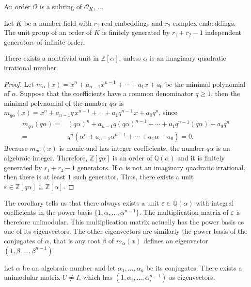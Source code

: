 \begin{definition}
  An order $\mathcal O$ is a subring of $\mathcal O_K$,
  ...
\end{definition}

\begin{theorem}
  Let $K$ be a number field with $r₁$ real embeddings and $r₂$ complex embeddings.
  The unit group of an order of $K$ is finitely generated by $r₁ + r₂ - 1$
  independent generators of infinite order.
\end{theorem}

\begin{corollary}
  \label{cor:nontrivial-unit}
  There exists a nontrivial unit in $ℤ[α]$,
  unless $α$ is an imaginary quadratic irrational number.
\end{corollary}

\begin{proof}
  Let $m_α(x) = x^n + a_{n-1} x^{n-1} + ⋯ + a_1 x + a_0$ be the minimal polynomial of $α$.
  Suppose that the coefficients have a common denominator $q ≥ 1$,
  then the minimal polynomial of the number $q α$ is
  $m_{q α}(x) = x^n + a_{n-1} q \, x^{n-1} + ⋯ + a_1 q^{n-1} \, x + a_0 q^n$,
  since
  \begin{align*}
    m_{qα}(qα) = {} & (q α)^n + a_{n-1} q (q α)^{n-1} + ⋯ + a_1 q^{n-1} (q α) + a_0 q^n \\
     = {}           & q^n (α^n + a_{n-1} α^{n-1} + ⋯ + a_1 α + a_0) = 0.
  \end{align*}
  Because $m_{qα}(x)$ is monic and has integer coefficients,
  the number $q α$ is an algebraic integer.
  Therefore, $ℤ[qα]$ is an order of $ℚ(α)$ and it is finitely generated by $r₁ + r₂ - 1$ generators.
  If $α$ is not an imaginary quadratic irrational, then there is at least $1$ such generator.
  Thus, there exists a unit $ε ∈ ℤ[q α] ⊆ ℤ[α]$.
\end{proof}

The corollary tells us that there always exists a unit $ε ∈ ℚ(α)$ with integral
coefficients in the power basis $\{1, α, …, α^{n-1}\}$.
The multiplication matrix of $ε$ is therefore unimodular.
This multiplication matrix actually has the power basis as one of its eigenvectors.
The other eigenvectors are similarly the power basis of the conjugates of $α$,
that is any root $β$ of $m_α(x)$ defines an eigenvector $(1, β, …, β^{n-1})$.

\begin{theorem}
  \label{thm:unimodular-algebraic}
  Let $α$ be an algebraic number and let $α_1, …, α_n$ be its conjugates.
  There exists a unimodular matrix $U ≠ I$,
  which has $(1, α_i, …, α_i^{n-1})$ as eigenvectors.
\end{theorem}

